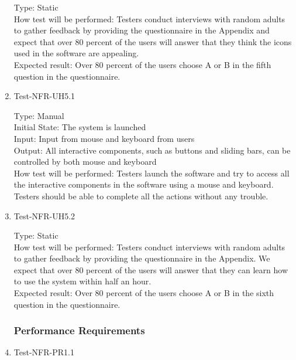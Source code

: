 \documentclass[12pt, titlepage]{article}
\begin{document}
\begin{enumerate}
Type: Static\\

How test will be performed: Testers conduct interviews with random adults to gather feedback by providing the questionnaire in the Appendix and expect that over 80 percent of the users will answer that they think the icons used in the software are appealing.\\

Expected result: Over 80 percent of the users choose A or B in the fifth question in the questionnaire.

\item{Test-NFR-UH5.1\\}

Type: Manual\\

Initial State: The system is launched\\

Input: Input from mouse and keyboard from users\\

Output: All interactive components, such as buttons and sliding bars, can be controlled by both mouse and keyboard\\

How test will be performed: Testers launch the software and try to access all the interactive components in the software using a mouse and keyboard. Testers should be able to complete all the actions without any trouble.

\item{Test-NFR-UH5.2\\}

Type: Static\\

How test will be performed: Testers conduct interviews with random adults to gather feedback by providing the questionnaire in the Appendix. We expect that over 80 percent of the users will answer that they can learn how to use the system within half an hour.\\

Expected result: Over 80 percent of the users choose A or B in the sixth question in the questionnaire.

\subsubsection{Performance Requirements}
\item{Test-NFR-PR1.1\\}


\end{enumerate}
\end{document}
